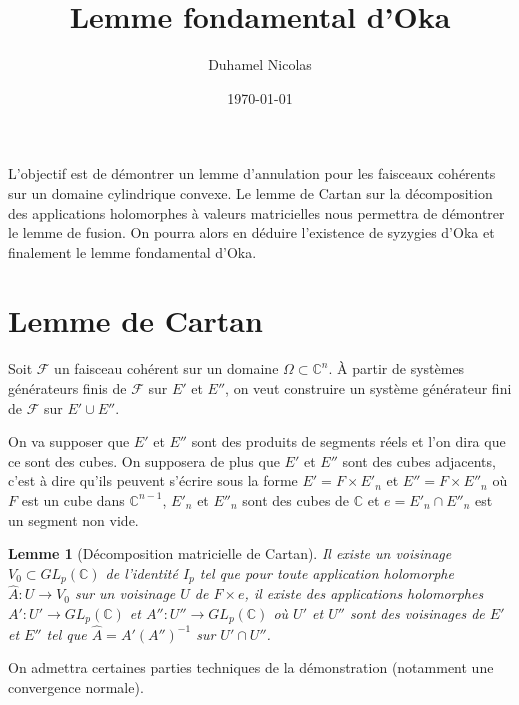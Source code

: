 \documentclass{article}
\newtheorem{lemme}[theoreme]{Lemme}
\theoremstyle{definition}
\theoremstyle{remarque}
\begin{document}
\title{Lemme fondamental d'Oka}
\date \today
\author{Duhamel Nicolas}
\maketitle

L'objectif est de démontrer un lemme d'annulation pour les faisceaux cohérents sur un domaine cylindrique convexe. Le lemme de Cartan sur la décomposition des applications holomorphes à valeurs matricielles nous permettra de démontrer le lemme de fusion. On pourra alors en déduire l'existence de syzygies d'Oka et finalement le lemme fondamental d'Oka.

\section{Lemme de Cartan}
Soit $\mathcal{F}$ un faisceau cohérent sur un domaine $\Omega \subset \mathbb{C}^n$. À partir de systèmes générateurs finis de $\mathcal{F}$ sur $E'$ et $E''$, on veut construire un système générateur fini de $\mathcal{F}$ sur $E' \cup E''$.

On va supposer que $E'$ et $E''$ sont des produits de segments réels et l'on dira que ce sont des cubes. On supposera de plus que $E'$ et $E''$ sont des cubes adjacents, c'est à dire qu'ils peuvent s'écrire sous la forme $E'=F \times E'_n$ et $E''=F \times E''_n$ où $F$ est un cube dans $\mathbb{C}^{n-1}$, $E'_n$ et $E''_n$ sont des cubes de $\mathbb{C}$ et $e=E'_n \cap E''_n$ est un segment non vide.

\begin{lemme}[Décomposition matricielle de Cartan]
Il existe un voisinage $V_0 \subset GL_p(\mathbb{C})$ de l'identité $I_p$ tel que pour toute application holomorphe $\hat{A} : U \to V_0$ sur un voisinage $U$ de $F \times e$, il existe des applications holomorphes $A' : U' \to GL_p(\mathbb{C})$ et $A'' : U'' \to GL_p(\mathbb{C})$ où $U'$ et $U''$ sont des voisinages de $E'$ et $E''$ tel que $\hat{A} = A'(A'')^{-1}$ sur $U' \cap U''$.
\end{lemme}

On admettra certaines parties techniques de la démonstration (notamment une convergence normale).
\end{document}
